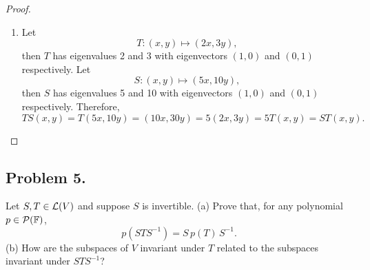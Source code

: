 \documentclass{article}
\newcommand*{\F}{\ensuremath{\mathbb{F}}}
\begin{document}
\begin{proof}
\begin{enumerate}[label=(\alph*)]
        \item Let 
        $$T:(x,y)\mapsto (2x,3y),$$
        then $T$ has eigenvalues 2 and 3 with eigenvectors $(1,0)$ and $(0,1)$ respectively.
        Let $$S:(x,y)\mapsto (5x,10y),$$ then $S$ has eigenvalues 5 and 10 with eigenvectors
        $(1,0)$ and $(0,1)$ respectively. Therefore, 
        $$TS(x,y) = T(5x,10y) = (10x,30y) = 5(2x,3y) = 5T(x,y) = ST(x,y).$$
    \end{enumerate}
\end{proof}


\newpage
\subsection*{Problem 5.}
Let $S, T\in {\cal L}(V)$ and suppose $S$ is invertible. (a) Prove that, for any polynomial 
$p\in {\cal P}({\F})$,  $$ p(STS^{-1}) = S\, p(T) \, S^{-1}.$$  (b) How are the subspaces of $V$ 
invariant under $T$ related to the subspaces invariant under $STS^{-1}$?
\end{document}
